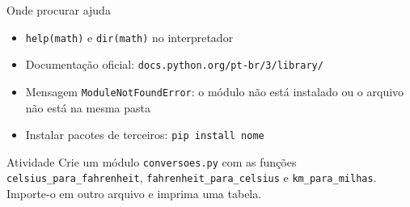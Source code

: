\documentclass[aspectratio=169,10pt,t]{beamer}
\begin{document}
\begin{frame}{Onde procurar ajuda}
  \begin{itemize}
    \item \texttt{help(math)} e \texttt{dir(math)} no interpretador
    \item Documentação oficial: \texttt{docs.python.org/pt-br/3/library/}
    \item Mensagem \texttt{ModuleNotFoundError}: o módulo não está instalado ou o arquivo não está na mesma pasta
    \item Instalar pacotes de terceiros: \texttt{pip install nome}
  \end{itemize}
  \begin{exampleblock}{Atividade}
    Crie um módulo \texttt{conversoes.py} com as funções \texttt{celsius\_para\_fahrenheit}, \texttt{fahrenheit\_para\_celsius} e \texttt{km\_para\_milhas}. Importe-o em outro arquivo e imprima uma tabela.
  \end{exampleblock}
\end{frame}


\end{document}
